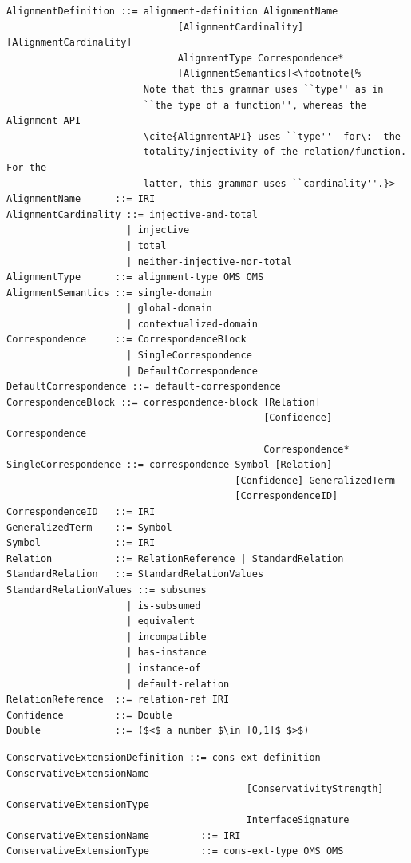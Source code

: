 \documentclass[10pt, a4paper]{isov2}
\begin{document}
\begin{lstlisting}[language=ebnf,escapeinside={()},mathescape]  % abstract syntax
AlignmentDefinition ::= alignment-definition AlignmentName
                              [AlignmentCardinality] [AlignmentCardinality]
                              AlignmentType Correspondence*
                              [AlignmentSemantics]<\footnote{%
                        Note that this grammar uses ``type'' as in
                        ``the type of a function'', whereas the Alignment API
                        \cite{AlignmentAPI} uses ``type''  for\:  the
                        totality/injectivity of the relation/function.  For the
                        latter, this grammar uses ``cardinality''.}>
AlignmentName      ::= IRI
AlignmentCardinality ::= injective-and-total
                     | injective
                     | total
                     | neither-injective-nor-total
AlignmentType      ::= alignment-type OMS OMS
AlignmentSemantics ::= single-domain
                     | global-domain
                     | contextualized-domain
Correspondence     ::= CorrespondenceBlock
                     | SingleCorrespondence
                     | DefaultCorrespondence
DefaultCorrespondence ::= default-correspondence
CorrespondenceBlock ::= correspondence-block [Relation]
                                             [Confidence] Correspondence
                                             Correspondence*
SingleCorrespondence ::= correspondence Symbol [Relation]
                                        [Confidence] GeneralizedTerm
                                        [CorrespondenceID]
CorrespondenceID   ::= IRI
GeneralizedTerm    ::= Symbol
Symbol             ::= IRI
Relation           ::= RelationReference | StandardRelation
StandardRelation   ::= StandardRelationValues
StandardRelationValues ::= subsumes
                     | is-subsumed
                     | equivalent
                     | incompatible
                     | has-instance
                     | instance-of
                     | default-relation
RelationReference  ::= relation-ref IRI
Confidence         ::= Double
Double             ::= ($<$ a number $\in [0,1]$ $>$) 
\end{lstlisting}

\begin{lstlisting}[language=ebnf,escapeinside={()},mathescape]  % abstract syntax
ConservativeExtensionDefinition ::= cons-ext-definition ConservativeExtensionName
                                          [ConservativityStrength] ConservativeExtensionType
                                          InterfaceSignature
ConservativeExtensionName         ::= IRI
ConservativeExtensionType         ::= cons-ext-type OMS OMS
\end{lstlisting}
\end{document}
